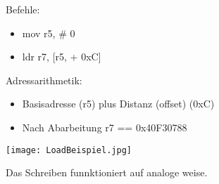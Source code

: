 		Befehle:
		\begin{itemize}
			\item mov r5, \# 0
			\item ldr r7, [r5, + 0xC]
		\end{itemize}
		\vspace{0.5cm}
			Adressarithmetik:
		\begin{itemize}
			\item Basisadresse (r5) plus Distanz (offset) (0xC)
			\item Nach Abarbeitung r7 == 0x40F30788
		\end{itemize}
		\begin{center}
			\texttt{[image: LoadBeispiel.jpg]}
		\end{center}
		\vspace{0.5cm}

		Das Schreiben funnktioniert auf analoge weise.



